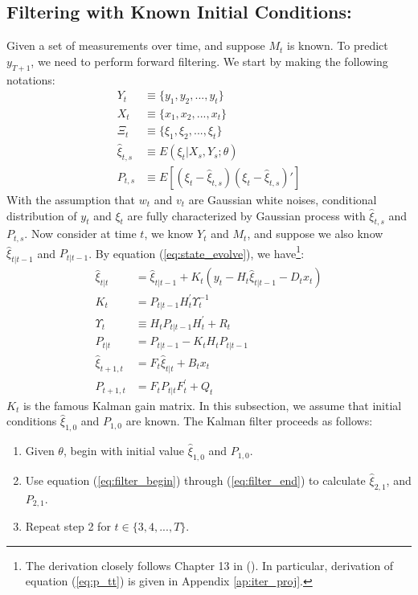 \documentclass[12pt]{article}
\newenvironment{boenumerate}
    {\begin{enumerate}\renewcommand\labelenumi{\textbf\theenumi}}
    {\end{enumerate}}
\numberwithin{equation}{section}
\begin{document}
\subsection{Filtering with Known Initial Conditions:}
Given a set of measurements over time, and suppose $M_t$ is known. To predict $y_{T+1}$, we need to perform forward filtering. We start by making the following notations:
\begin{align*}
    Y_t &\equiv \{y_1, y_2, ..., y_t\} \\
    X_t &\equiv \{x_1, x_2, ..., x_t\} \\
    \Xi_t &\equiv \{\xi_1,\xi_2,...,\xi_t\} \\
    \hat{\xi}_{t,s} &\equiv E(\xi_t|X_{s},Y_{s};\theta) \\
    P_{t,s} &\equiv E[(\xi_t-\hat{\xi}_{t,s})(\xi_t-\hat{\xi}_{t,s})']
\end{align*}
With the assumption that $w_t$ and $v_t$ are Gaussian white noises, conditional distribution of $y_t$ and $\xi_t$ are fully characterized by Gaussian process with $\hat{\xi}_{t,s}$ and $P_{t,s}$. Now consider at time $t$, we know $Y_t$ and $M_t$, and suppose we also know $\hat{\xi}_{t|t-1}$ and $P_{t|t-1}$. By equation (\ref{eq:state_evolve}), we have\footnote{The derivation closely follows Chapter 13 in (\cite{hamilton_1994}). In particular, derivation of equation (\ref{eq:p_tt}) is given in Appendix \ref{ap:iter_proj}.}:
\begin{align}
    \hat{\xi}_{t|t} &= \hat{\xi}_{t|t-1} + K_t(y_t-H_t\hat{\xi}_{t|t-1}-D_tx_t) \label{eq:filter_begin} \\
    K_t &= P_{t|t-1}H_t^{'}\Upsilon_t^{-1} \label{eq:gain} \\
    \Upsilon_t &\equiv H_tP_{t|t-1}H_t^{'} + R_t \\
    P_{t|t} &= P_{t|t-1} - K_tH_tP_{t|t-1} \label{eq:p_tt} \\
    \hat{\xi}_{t+1,t} &= F_t\hat{\xi}_{t|t} + B_tx_t \label{eq:xi_t1} \\
    P_{t+1,t} &= F_tP_{t|t}F_t^{'}+Q_t \label{eq:filter_end}
\end{align}
$K_t$ is the famous Kalman gain matrix. In this subsection, we assume that initial conditions $\hat{\xi}_{1,0}$ and $P_{1,0}$ are known. The Kalman filter proceeds as follows:
\begin{boenumerate}
    \item Given $\theta$, begin with initial value $\hat{\xi}_{1,0}$ and $P_{1,0}$.
    \item Use equation (\ref{eq:filter_begin}) through (\ref{eq:filter_end}) to calculate $\hat{\xi}_{2,1}$, and $P_{2,1}$.
    \item Repeat step 2 for $t\in\{3, 4, ..., T\}$.
\end{boenumerate}
\end{document}
